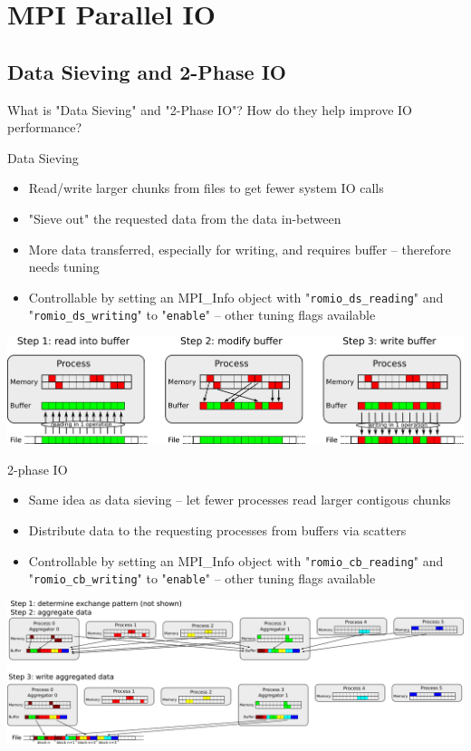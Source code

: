 \documentclass[9pt,pdftex,xcolor=dvipsnames]{beamer}
\begin{document}
\section{MPI Parallel IO}
\begin{frame}{\phantom{Contents}}
\tableofcontents[
  currentsection  
]
\end{frame}


\subsection{Data Sieving and 2-Phase IO}
\begin{frame}{\insertsubsection}
What is "Data Sieving" and "2-Phase IO"? How do they help improve IO performance?
\end{frame}

\begin{frame}{Data Sieving}
\begin{itemize}
	\item Read/write larger chunks from files to get fewer system IO calls
	\item "Sieve out" the requested data from the data in-between
	\item More data transferred, especially for writing, and requires buffer -- therefore needs tuning
	\item Controllable by setting an MPI\_Info object with "\texttt{romio\_ds\_reading}" and "\texttt{romio\_ds\_writing}" to "\texttt{enable}" -- other tuning flags available
\end{itemize}
\includegraphics[width=\textwidth]{img/datasieving.png}
\end{frame}

\begin{frame}{2-phase IO}
\begin{itemize}
	\item Same idea as data sieving -- let fewer processes read larger contigous chunks
	\item Distribute data to the requesting processes from buffers via scatters
	\item Controllable by setting an MPI\_Info object with "\texttt{romio\_cb\_reading}" and "\texttt{romio\_cb\_writing}" to "\texttt{enable}" -- other tuning flags available
\end{itemize}
\includegraphics[width=\textwidth]{img/2phaseio.png}
\end{frame}
\end{document}
